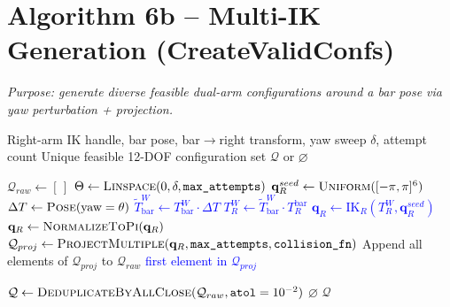 \documentclass[11pt]{article}
\newcommand{\chg}[1]{\textcolor{blue}{#1}}
\newcommand{\AlgTarget}[1]{\hypertarget{#1}{}}
\begin{document}
\section*{Algorithm 6b -- Multi-IK Generation (CreateValidConfs)}
\noindent\textit{Purpose: generate diverse feasible dual-arm configurations around a bar pose via yaw perturbation + projection.}
\AlgTarget{alg:create_valid_confs}
\begin{algorithm}[H]
\caption{\textsc{CreateValidConfs}($\text{IK}_R,\,T^W_{\text{bar}},\,T_R^{\text{bar}},\,\delta,\,\texttt{max\_attempts}$)}
\begin{algorithmic}[1]
\Require Right-arm IK handle, bar pose, bar$\rightarrow$right transform, yaw sweep $\delta$, attempt count
\Ensure  Unique feasible 12-DOF configuration set $\mathcal{Q}$ or $\varnothing$

\State $\mathcal{Q}_{raw} \gets [\,]$
\State \chg{$\Theta \gets \textsc{Linspace}(0,\delta,\texttt{max\_attempts})$}
\ForEach{$\theta \in \Theta$}
  \State \chg{$\mathbf{q}^{seed}_R \gets \textsc{Uniform}([-\pi,\pi]^6)$}
  \State \chg{$\Delta T \gets \textsc{Pose}(\text{yaw}=\theta)$}
  \State \chg{$\tilde{T}^W_{\text{bar}} \gets T^W_{\text{bar}} \cdot \Delta T$}
  \State \chg{$T^W_R \gets \tilde{T}^W_{\text{bar}} \cdot T_R^{\text{bar}}$}
  \State \chg{$\mathbf{q}_R \gets \text{IK}_R(T^W_R,\mathbf{q}^{seed}_R)$}
    \State \chg{$\mathbf{q}_R \gets \textsc{NormalizeToPi}(\mathbf{q}_R)$}
    \State \chg{$\mathcal{Q}_{proj} \gets \textsc{ProjectMultiple}(\mathbf{q}_R,\texttt{max\_attempts},\texttt{collision\_fn})$}
      \State Append all elements of $\mathcal{Q}_{proj}$ to $\mathcal{Q}_{raw}$
      \If{\chg{\texttt{immediate} is True}}
        \State \chg{\Return first element in $\mathcal{Q}_{proj}$}
      \EndIf
    \EndIf
  \EndIf
\EndFor

\State \chg{$\mathcal{Q} \gets \textsc{DeduplicateByAllClose}(\mathcal{Q}_{raw},\texttt{atol}=10^{-2})$}
  \State \Return $\varnothing$
\EndIf
\State \Return $\mathcal{Q}$
\end{algorithmic}
\end{algorithm}

\end{document}
